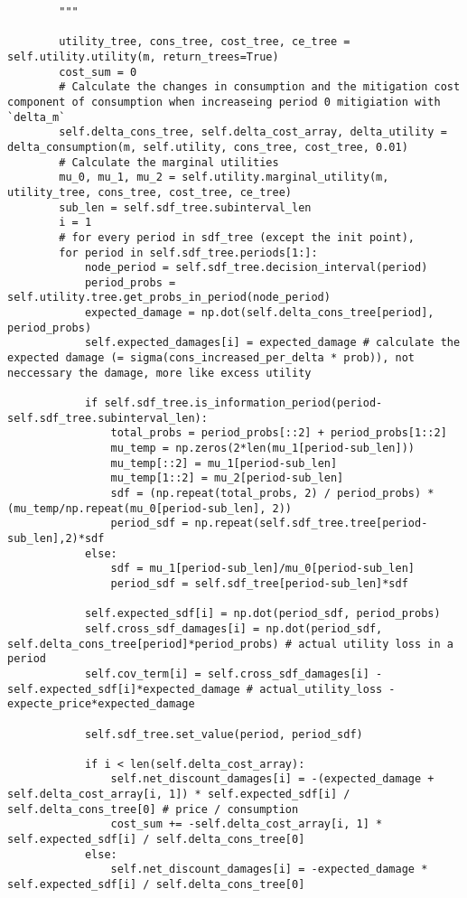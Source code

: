 \documentclass[12pt]{article}
\begin{document}
\begin{verbatim}
		"""

		utility_tree, cons_tree, cost_tree, ce_tree = self.utility.utility(m, return_trees=True)
		cost_sum = 0
		# Calculate the changes in consumption and the mitigation cost component of consumption when increaseing period 0 mitigiation with `delta_m`
		self.delta_cons_tree, self.delta_cost_array, delta_utility = delta_consumption(m, self.utility, cons_tree, cost_tree, 0.01)
		# Calculate the marginal utilities
		mu_0, mu_1, mu_2 = self.utility.marginal_utility(m, utility_tree, cons_tree, cost_tree, ce_tree)
		sub_len = self.sdf_tree.subinterval_len
		i = 1
		# for every period in sdf_tree (except the init point),
		for period in self.sdf_tree.periods[1:]:
			node_period = self.sdf_tree.decision_interval(period)
			period_probs = self.utility.tree.get_probs_in_period(node_period)
			expected_damage = np.dot(self.delta_cons_tree[period], period_probs)
			self.expected_damages[i] = expected_damage # calculate the expected damage (= sigma(cons_increased_per_delta * prob)), not neccessary the damage, more like excess utility
			
			if self.sdf_tree.is_information_period(period-self.sdf_tree.subinterval_len):
				total_probs = period_probs[::2] + period_probs[1::2]
				mu_temp = np.zeros(2*len(mu_1[period-sub_len]))
				mu_temp[::2] = mu_1[period-sub_len]
				mu_temp[1::2] = mu_2[period-sub_len]
				sdf = (np.repeat(total_probs, 2) / period_probs) * (mu_temp/np.repeat(mu_0[period-sub_len], 2))
				period_sdf = np.repeat(self.sdf_tree.tree[period-sub_len],2)*sdf
			else:
				sdf = mu_1[period-sub_len]/mu_0[period-sub_len]
				period_sdf = self.sdf_tree[period-sub_len]*sdf

			self.expected_sdf[i] = np.dot(period_sdf, period_probs)
			self.cross_sdf_damages[i] = np.dot(period_sdf, self.delta_cons_tree[period]*period_probs) # actual utility loss in a period
			self.cov_term[i] = self.cross_sdf_damages[i] - self.expected_sdf[i]*expected_damage # actual_utility_loss - expecte_price*expected_damage

			self.sdf_tree.set_value(period, period_sdf)

			if i < len(self.delta_cost_array):
				self.net_discount_damages[i] = -(expected_damage + self.delta_cost_array[i, 1]) * self.expected_sdf[i] / self.delta_cons_tree[0] # price / consumption
				cost_sum += -self.delta_cost_array[i, 1] * self.expected_sdf[i] / self.delta_cons_tree[0]
			else:
				self.net_discount_damages[i] = -expected_damage * self.expected_sdf[i] / self.delta_cons_tree[0]


\end{verbatim}
\end{document}
